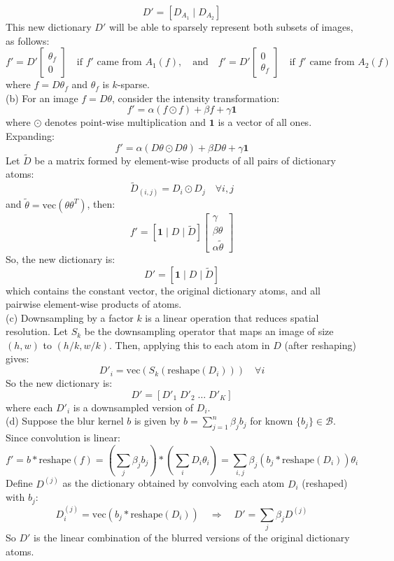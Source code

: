 \documentclass{article}
\begin{document}
    \[
    D' = [D_{A_1} \; | \; D_{A_2}]
    \]
    This new dictionary $D'$ will be able to sparsely represent both subsets of images, as follows:
    \[
    f' = D' \begin{bmatrix}
        \theta_f \\ 0
    \end{bmatrix} \quad \text{if } f' \text{ came from } A_1(f),
    \quad \text{and} \quad
    f' = D' \begin{bmatrix}
        0 \\ \theta_f
    \end{bmatrix} \quad \text{if } f' \text{ came from } A_2(f)
    \]
    where $f = D \theta_f$ and $\theta_f$ is $k$-sparse.\\[1em]

\noindent (b) For an image $f = D\theta$, consider the intensity transformation:
    \[
    f' = \alpha (f \odot f) + \beta f + \gamma \mathbf{1}
    \]
    where $\odot$ denotes point-wise multiplication and $\mathbf{1}$ is a vector of all ones. Expanding:
    \[
    f' = \alpha (D\theta \odot D\theta) + \beta D\theta + \gamma \mathbf{1}
    \]
    Let $\widetilde{D}$ be a matrix formed by element-wise products of all pairs of dictionary atoms:
    \[
    \widetilde{D}_{(i,j)} = D_i \odot D_j \quad \forall i,j
    \]
    and $\widetilde{\theta} = \text{vec}(\theta\theta^T)$, then:
    \[
    f' = [\mathbf{1} \; | \; D \; | \; \widetilde{D}]
    \begin{bmatrix}
        \gamma \\ \beta \theta \\ \alpha \widetilde{\theta}
    \end{bmatrix}
    \]
    So, the new dictionary is:
    \[
    D' = [\mathbf{1} \; | \; D \; | \; \widetilde{D}]
    \]
    which contains the constant vector, the original dictionary atoms, and all pairwise element-wise products of atoms.\\[1em]

\noindent (c) Downsampling by a factor $k$ is a linear operation that reduces spatial resolution. Let $S_k$ be the downsampling operator that maps an image of size $(h, w)$ to $(h/k, w/k)$. Then, applying this to each atom in $D$ (after reshaping) gives:
    \[
    D'_i = \text{vec}(S_k(\text{reshape}(D_i))) \quad \forall i
    \]
    So the new dictionary is:
    \[
    D' = [D'_1 \; D'_2 \; \dots \; D'_K]
    \]
    where each $D'_i$ is a downsampled version of $D_i$.\\[1em]

\noindent (d) Suppose the blur kernel $b$ is given by $b = \sum_{j=1}^{n} \beta_j b_j$ for known $\{b_j\} \in \mathcal{B}$. Since convolution is linear:
    \[
    f' = b * \text{reshape}(f) = \left( \sum_j \beta_j b_j \right) * \left( \sum_i D_i \theta_i \right)
    = \sum_{i,j} \beta_j (b_j * \text{reshape}(D_i)) \theta_i
    \]
    Define $D^{(j)}$ as the dictionary obtained by convolving each atom $D_i$ (reshaped) with $b_j$:
    \[
    D^{(j)}_i = \text{vec}(b_j * \text{reshape}(D_i)) \quad \Rightarrow \quad D' = \sum_j \beta_j D^{(j)}
    \]
    So $D'$ is the linear combination of the blurred versions of the original dictionary atoms.\\[1em]
\end{document}
